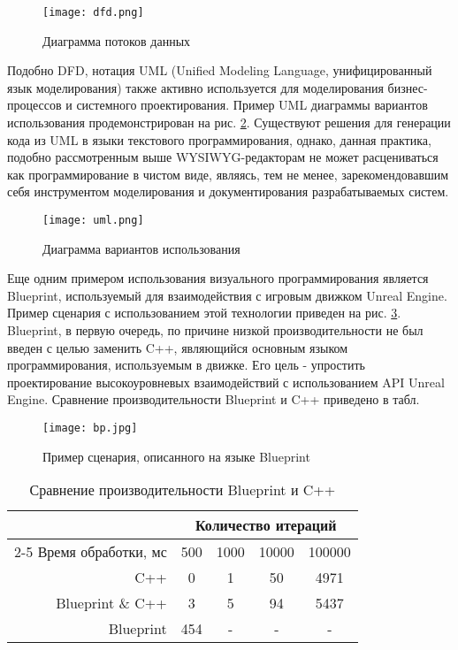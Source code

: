 
\begin{figure}[htbp]
	\centering
	\texttt{[image: dfd.png]}
	\caption{Диаграмма потоков данных}%
	\label{fig:dfd}
\end{figure}

Подобно DFD, нотация UML (Unified Modeling Language, унифицированный язык моделирования) также активно используется для моделирования бизнес-процессов и системного проектирования. Пример UML диаграммы вариантов использования продемонстрирован на рис. \ref{fig:uml}. Существуют решения \cite{uml} для генерации кода из UML в языки текстового программирования, однако, данная практика, подобно рассмотренным выше WYSIWYG-редакторам не может расцениваться как программирование в чистом виде, являясь, тем не менее, зарекомендовавшим себя инструментом моделирования и документирования разрабатываемых систем.


\begin{figure}[htbp]
	\centering
	\texttt{[image: uml.png]}
	\caption{Диаграмма вариантов использования}%
	\label{fig:uml}
\end{figure}

Еще одним примером использования визуального программирования является Blueprint, используемый для взаимодействия с игровым движком Unreal Engine. Пример сценария с использованием этой технологии приведен на рис. \ref{fig:bp}. Blueprint, в первую очередь, по причине низкой производительности \cite{bptb} не был введен с целью заменить C++, являющийся основным языком программирования, используемым в движке. Его цель - упростить проектирование высокоуровневых взаимодействий с использованием API Unreal Engine. Сравнение производительности Blueprint и C++ приведено в табл.

\begin{figure}[htbp]
	\centering
	\texttt{[image: bp.jpg]}
	\caption{Пример сценария, описанного на языке Blueprint}%
	\label{fig:bp}
\end{figure}

\begin{table}
\captionsetup{skip=5pt}
\caption{Сравнение производительности Blueprint и C++}
\centering
\begin{tabular}{|r|c|c|c|c|}
\hline
            \multirow{2}{*}{} 
           & \multicolumn{4}{c|}{Количество итераций} \\ \cline{2-5}
Время обработки, мс & 500   & 1000  & 10000 & 100000  \\ \hline
C++		  			& 0    	& 1     & 50    & 4971     \\ \hline
Blueprint \& C++	& 3    	& 5     & 94    & 5437     \\ \hline
Blueprint			& 454   & -     & -     & -      \\ \hline
\end{tabular}
\end{table}


